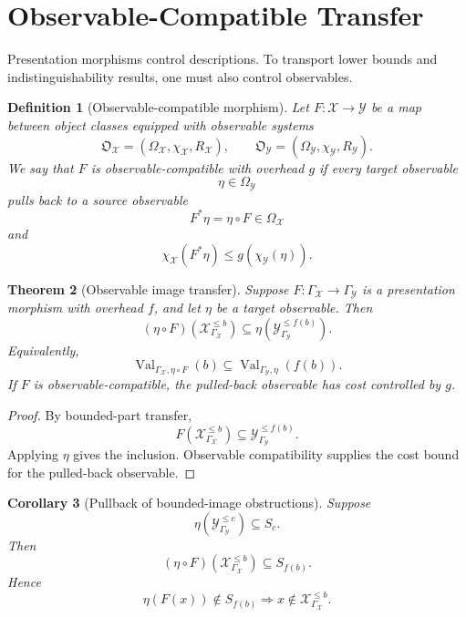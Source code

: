 \documentclass[11pt]{article}
\newtheorem{theorem}{Theorem}[section]
\newtheorem{corollary}[theorem]{Corollary}
\newtheorem{definition}[theorem]{Definition}
\begin{document}
\section{Observable-Compatible Transfer}

Presentation morphisms control descriptions. To transport lower bounds and indistinguishability results, one must also control observables.

\begin{definition}[Observable-compatible morphism]
Let \(F:\mathcal X\to\mathcal Y\) be a map between object classes equipped with observable systems
\[
\mathfrak O_\mathcal X=(\Omega_\mathcal X,\chi_\mathcal X,R_\mathcal X),
\qquad
\mathfrak O_\mathcal Y=(\Omega_\mathcal Y,\chi_\mathcal Y,R_\mathcal Y).
\]
We say that \(F\) is observable-compatible with overhead \(g\) if every target observable
\[
\eta\in\Omega_\mathcal Y
\]
pulls back to a source observable
\[
F^\ast\eta=\eta\circ F\in\Omega_\mathcal X
\]
and
\[
\chi_\mathcal X(F^\ast\eta)
\leq
g(\chi_\mathcal Y(\eta)).
\]
\end{definition}

\begin{theorem}[Observable image transfer]
Suppose \(F:\Gamma_\mathcal X\to\Gamma_\mathcal Y\) is a presentation morphism with overhead \(f\), and let \(\eta\) be a target observable. Then
\[
(\eta\circ F)(\mathcal X_{\Gamma_\mathcal X}^{\leq b})
\subseteq
\eta(\mathcal Y_{\Gamma_\mathcal Y}^{\leq f(b)}).
\]
Equivalently,
\[
\operatorname{Val}_{\Gamma_\mathcal X,\eta\circ F}(b)
\subseteq
\operatorname{Val}_{\Gamma_\mathcal Y,\eta}(f(b)).
\]
If \(F\) is observable-compatible, the pulled-back observable has cost controlled by \(g\).
\end{theorem}

\begin{proof}
By bounded-part transfer,
\[
F(\mathcal X_{\Gamma_\mathcal X}^{\leq b})
\subseteq
\mathcal Y_{\Gamma_\mathcal Y}^{\leq f(b)}.
\]
Applying \(\eta\) gives the inclusion. Observable compatibility supplies the cost bound for the pulled-back observable.
\end{proof}

\begin{corollary}[Pullback of bounded-image obstructions]
Suppose
\[
\eta(\mathcal Y_{\Gamma_\mathcal Y}^{\leq c})\subseteq S_c.
\]
Then
\[
(\eta\circ F)(\mathcal X_{\Gamma_\mathcal X}^{\leq b})
\subseteq
S_{f(b)}.
\]
Hence
\[
\eta(F(x))\notin S_{f(b)}
\Longrightarrow
x\notin\mathcal X_{\Gamma_\mathcal X}^{\leq b}.
\]
\end{corollary}
\end{document}
